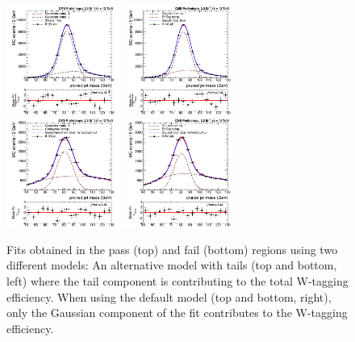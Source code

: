 \begin{figure}[ht!]
  \centering
    \includegraphics[width=0.33\textwidth]{figures/vtagging/AN-16-215/2Gauss.pdf}
    \includegraphics[width=0.33\textwidth]{figures/vtagging/AN-16-215/GausErfExpPass.pdf}\\
    \includegraphics[width=0.33\textwidth]{figures/vtagging/AN-16-215/GausChebysgev.pdf}
    \includegraphics[width=0.33\textwidth]{figures/vtagging/AN-16-215/GausErfExpFail.pdf}
  \caption{Fits obtained in the pass (top) and fail (bottom) regions using two different models: An alternative model with tails (top and bottom, left) where the tail component is contributing to the total W-tagging efficiency. When using the default model (top and bottom, right), only the Gaussian component of the fit contributes to the W-tagging efficiency.}
  \label{fig:searchII:gausvstails}
\end{figure} 
